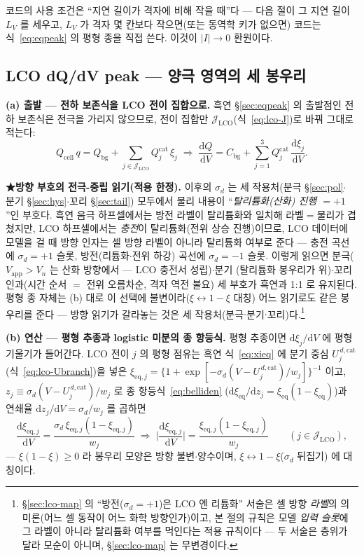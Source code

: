 \documentclass[11pt,a4paper]{article}
\newcommand{\dd}{\mathrm{d}}
\newcommand{\eq}{\mathrm{eq}}
\newcommand{\app}{\mathrm{app}}
\newcommand{\cell}{\mathrm{cell}}
\newcommand{\bg}{\mathrm{bg}}
\begin{document}
코드의 사용 조건은 ``지연 길이가 격자에 비해 작을 때''다 — 다음 절이 그 지연 길이 $L_V$ 를 세우고, $L_V$ 가 격자
몇 칸보다 작으면(또는 동역학 키가 없으면) 코드는 식~\eqref{eq:eqpeak} 의 평형 종을 직접 쓴다. 이것이 $|I|\to0$ 환원이다.

\subsection{LCO dQ/dV peak — 양극 영역의 세 봉우리}\label{sec:lco-peak}
\textbf{(a) 출발 — 전하 보존식을 LCO 전이 집합으로.} 흑연 \S\ref{sec:eqpeak} 의 출발점인 전하 보존식은
전극을 가리지 않으므로, 전이 집합만 $\mathcal J_\mathrm{LCO}$(식~\eqref{eq:lco-J})로 바꿔 그대로 적는다:
\begin{equation}
Q_\cell\,q=Q_\bg+\sum_{j\in\mathcal J_\mathrm{LCO}}Q_j^\mathrm{cat}\,\xi_j
\;\Longrightarrow\;
\frac{\dd Q}{\dd V}=C_\bg+\sum_{j=1}^{3}Q_j^\mathrm{cat}\,\frac{\dd\xi_j}{\dd V}.
\label{eq:lco-charge}
\end{equation}

\textbf{★방향 부호의 전극-중립 읽기(적용 한정).} 이후의 $\sigma_d$ 는 세 작용처(분극 \S\ref{sec:pol}$\cdot$
분기 \S\ref{sec:hys}$\cdot$꼬리 \S\ref{sec:tail}) 모두에서 물리 내용이 ``\emph{탈리튬화(산화) 진행
$=+1$}''인 부호다. 흑연 음극 하프셀에서는 방전 라벨이 탈리튬화와 일치해 라벨$=$물리가 겹쳤지만, LCO
하프셀에서는 \emph{충전}이 탈리튬화(전위 상승 진행)이므로, LCO 데이터에 모델을 걸 때 방향 인자는 셀 방향
라벨이 아니라 탈리튬화 여부로 준다 — 충전 곡선에 $\sigma_d=+1$ 슬롯, 방전(리튬화$\cdot$전위 하강) 곡선에
$\sigma_d=-1$ 슬롯. 이렇게 읽으면 분극($V_\app>V_n$ 는 산화 방향에서 — LCO 충전서 성립)$\cdot$분기
(탈리튬화 봉우리가 위)$\cdot$꼬리 인과(시간 순서 $=$ 전위 오름차순, 격자 역전 불요) 세 부호가 흑연과 1:1
로 유지된다. 평형 종 자체는 (b) 대로 이 선택에 불변이라($\xi\leftrightarrow1-\xi$ 대칭) 어느 읽기로도 같은
봉우리를 준다 — 방향 읽기가 갈라놓는 것은 세 작용처(분극$\cdot$분기$\cdot$꼬리)다.\footnote{\S\ref{sec:lco-map}
의 ``방전($\sigma_d=+1$)은 LCO 엔 리튬화'' 서술은 셀 방향 \emph{라벨}의 의미론(어느 셀 동작이 어느 화학
방향인가)이고, 본 절의 규칙은 모델 \emph{입력 슬롯}에 그 라벨이 아니라 탈리튬화 여부를 먹인다는 적용
규칙이다 — 두 서술은 층위가 달라 모순이 아니며, \S\ref{sec:lco-map} 는 무변경이다.}

\textbf{(b) 연산 — 평형 추종과 logistic 미분의 종 항등식.} 평형 추종이면 $\dd\xi_j/\dd V$ 에 평형 기울기가
들어간다. LCO 전이 $j$ 의 평형 점유는 흑연 식~\eqref{eq:xieq} 에 분기 중심 $U_j^{\,d,\mathrm{cat}}$
(식~\eqref{eq:lco-Ubranch})을 넣은
$\xi_{\eq,j}=\{1+\exp[-\sigma_d(V-U_j^{\,d,\mathrm{cat}})/w_j]\}^{-1}$ 이고,
$z_j\equiv\sigma_d(V-U_j^{\,d,\mathrm{cat}})/w_j$ 로 종 항등식~\eqref{eq:belliden}
($\dd\xi_\eq/\dd z_j=\xi_\eq(1-\xi_\eq)$)과 연쇄율 $\dd z_j/\dd V=\sigma_d/w_j$ 를 곱하면
\begin{equation}
\frac{\dd\xi_{\eq,j}}{\dd V}=\frac{\sigma_d\,\xi_{\eq,j}(1-\xi_{\eq,j})}{w_j}
\;\Longrightarrow\;
\Big|\frac{\dd\xi_{\eq,j}}{\dd V}\Big|=\frac{\xi_{\eq,j}(1-\xi_{\eq,j})}{w_j}
\qquad(j\in\mathcal J_\mathrm{LCO}),
\label{eq:lco-belliden}
\end{equation}
— $\xi(1-\xi)\ge0$ 라 봉우리 모양은 방향 불변$\cdot$양수이며, $\xi\leftrightarrow1-\xi$($\sigma_d$ 뒤집기)
에 대칭이다.
\end{document}
